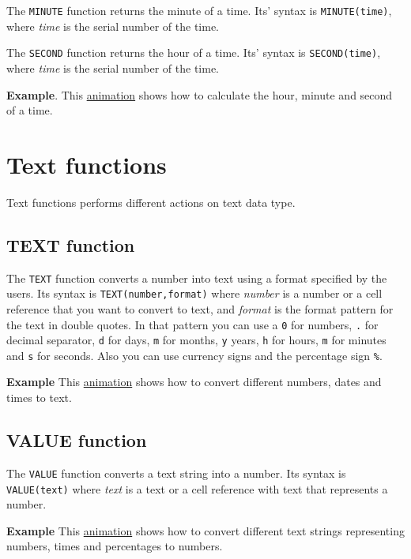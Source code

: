 The \texttt{MINUTE} function returns the minute of a time. Its' syntax is \texttt{MINUTE(time)}, where \emph{time} is the serial number of the time.

The \texttt{SECOND} function returns the hour of a time. Its' syntax is \texttt{SECOND(time)}, where \emph{time} is the serial number of the time.

\textbf{Example}. This \href{http://aprendeconalf.es/office/excel/manual/img/example_function_hour.gif}{animation} shows how to calculate the hour, minute and second of a time.



\section{Text functions}\label{textfunctions}
Text functions performs different actions on text data type.

\subsection{TEXT function}\label{textfunction}
The \texttt{TEXT} function converts a number into text using a format specified by the users. Its syntax is \texttt{TEXT(number,format)} where \emph{number} is a number or a cell reference that you want to convert to text, and \emph{format} is the format pattern for the text in double quotes. In that pattern you can use a \texttt{0} for numbers, \texttt{.} for decimal separator, \texttt{d} for days, \texttt{m} for months, \texttt{y} years, \texttt{h} for hours, \texttt{m} for minutes and \texttt{s} for seconds. Also you can use currency signs and the percentage sign \texttt{\%}. 

\textbf{Example} This \href{http://aprendeconalf.es/office/excel/manual/img/example_function_text.gif}{animation} shows
how to convert different numbers, dates and times to text.


\subsection{VALUE function}\label{valuefunction}
The \texttt{VALUE} function converts a text string into a number. Its syntax is \texttt{VALUE(text)} where \emph{text} is a text or a cell reference with text that represents a number.

\textbf{Example} This \href{http://aprendeconalf.es/office/excel/manual/img/example_function_value.gif}{animation} shows
how to convert different text strings representing numbers, times and percentages to numbers.


